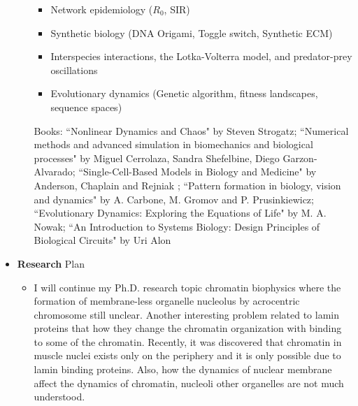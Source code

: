 \documentclass{res}
\begin{document}
\begin{resume}
\begin{itemize}
\begin{enumerate}
\begin{itemize}
        \item Network epidemiology ($R_0$, SIR) 
        \item Synthetic biology (DNA Origami,  Toggle switch, Synthetic ECM) 
        \item Interspecies interactions, the Lotka-Volterra model, and predator-prey oscillations    
        \item Evolutionary dynamics (Genetic algorithm, fitness landscapes, sequence spaces)
    \end{itemize}
Books: ``Nonlinear Dynamics and Chaos" by Steven Strogatz; ``Numerical methods and advanced simulation in biomechanics and biological processes" by Miguel Cerrolaza, Sandra Shefelbine, Diego Garzon-Alvarado; ``Single-Cell-Based Models in Biology and Medicine" by Anderson, Chaplain and Rejniak ; ``Pattern formation in biology, vision and dynamics" by A. Carbone, M. Gromov and P. Prusinkiewicz;  ``Evolutionary Dynamics: Exploring the Equations of Life" by M. A. Nowak;  ``An Introduction to Systems Biology: Design Principles of Biological Circuits" by Uri Alon 


\end{enumerate}

\item {\bf Research} Plan \\ 
\begin{itemize}
\item I will continue my Ph.D. research topic chromatin biophysics where the formation of membrane-less organelle nucleolus by acrocentric chromosome still unclear. Another interesting problem related to lamin proteins that how they change the chromatin organization with binding to some of the chromatin. Recently, it was discovered that chromatin in muscle nuclei exists only on the periphery and it is only possible due to lamin binding proteins. Also, how the dynamics of nuclear membrane affect the dynamics of chromatin, nucleoli other organelles are not much understood.   


\end{itemize}
\end{itemize}
\end{resume}
\end{document}
